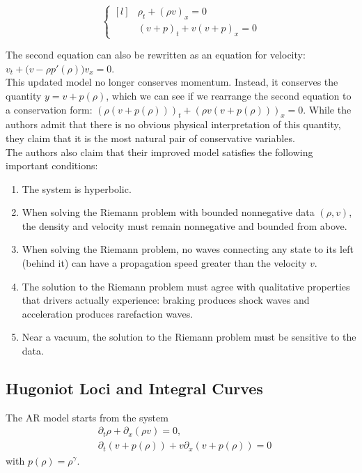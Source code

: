 \documentclass{article}
\begin{document}
\[ \left\{ \begin{matrix*}[l] & \rho_t + (\rho v)_x = 0 \\[1ex] & (v + p)_t + v (v + p)_x = 0 \end{matrix*} \right. \]

The second equation can also be rewritten as an equation for velocity: $v_t + \Big(v - \rho p'(\rho)\Big)v_x = 0$. \\

This updated model no longer conserves momentum.  Instead, it conserves the quantity $y = v + p(\rho)$, which we can see if we rearrange the second equation to a conservation form: $(\rho (v + p(\rho)))_t + (\rho v(v + p(\rho)))_x = 0$. While the authors admit that there is no obvious physical interpretation of this quantity, they claim that it is the most natural pair of conservative variables. \\

The authors also claim that their improved model satisfies the following important conditions:
\begin{enumerate}
\item The system is hyperbolic.
\item When solving the Riemann problem with bounded nonnegative data $(\rho, v)$, the density and velocity must remain nonnegative and bounded from above.
\item When solving the Riemann problem, no waves connecting any state to its left (behind it) can have a propagation speed greater than the velocity $v$.
\item The solution to the Riemann problem must agree with qualitative properties that drivers actually experience: braking produces shock waves and acceleration produces rarefaction waves.
\item Near a vacuum, the solution to the Riemann problem must be sensitive to the data.
\end{enumerate}

\subsection{Hugoniot Loci and Integral Curves}
The AR model starts from the system
\begin{align}
&\partial_t\rho + \partial_x(\rho v) = 0, \label{AW:eq1}\\
&\partial_t \left(v + p(\rho )\right) + v\partial_x \left( v + p(\rho )\right) = 0\label{AW:eq1.5}
\end{align}
with $p(\rho) = \rho^\gamma$.
\end{document}
